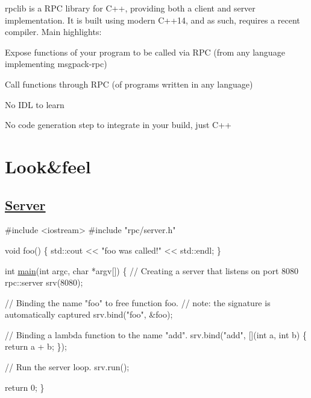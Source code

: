 \href{https://waffle.io/rpclib/rpclib}{\tt }

{\ttfamily rpclib} is a R\+PC library for C++, providing both a client and server implementation. It is built using modern C++14, and as such, requires a recent compiler. Main highlights\+:


\begin{DoxyItemize}
\item Expose functions of your program to be called via R\+PC (from any language implementing msgpack-\/rpc)
\item Call functions through R\+PC (of programs written in any language)
\item No I\+DL to learn
\item No code generation step to integrate in your build, just C++
\end{DoxyItemize}

\section*{Look\&feel}

\subsection*{\hyperlink{classServer}{Server}}


\begin{DoxyCode}
\textcolor{preprocessor}{#include <iostream>}
\textcolor{preprocessor}{#include "rpc/server.h"}

\textcolor{keywordtype}{void} foo() \{
    std::cout << \textcolor{stringliteral}{"foo was called!"} << std::endl;
\}

\textcolor{keywordtype}{int} \hyperlink{main_8cpp_ae66f6b31b5ad750f1fe042a706a4e3d4}{main}(\textcolor{keywordtype}{int} argc, \textcolor{keywordtype}{char} *argv[]) \{
    \textcolor{comment}{// Creating a server that listens on port 8080}
    rpc::server srv(8080);

    \textcolor{comment}{// Binding the name "foo" to free function foo.}
    \textcolor{comment}{// note: the signature is automatically captured}
    srv.bind(\textcolor{stringliteral}{"foo"}, &foo);

    \textcolor{comment}{// Binding a lambda function to the name "add".}
    srv.bind(\textcolor{stringliteral}{"add"}, [](\textcolor{keywordtype}{int} a, \textcolor{keywordtype}{int} b) \{
        \textcolor{keywordflow}{return} a + b;
    \});

    \textcolor{comment}{// Run the server loop.}
    srv.run();

    \textcolor{keywordflow}{return} 0;
\}
\end{DoxyCode}


